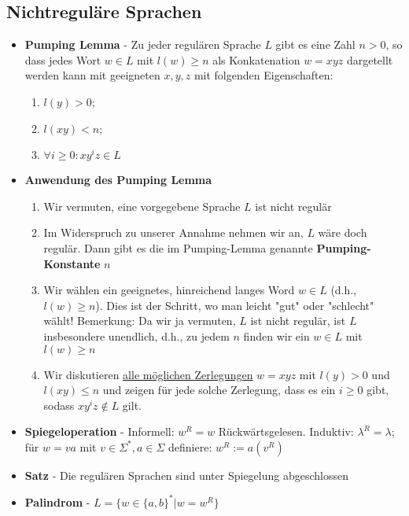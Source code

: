 \documentclass[12pt, a4paper]{article}
\begin{document}
	\subsection{Nichtreguläre Sprachen}
	\begin{itemize}
		\item \textbf{Pumping Lemma} - Zu jeder regulären Sprache $L$ gibt es eine Zahl $n>0$, so dass jedes Wort $w\in L$ mit $l(w)\geq n$ als Konkatenation $w = xyz$ dargetellt werden kann mit geeigneten $x,y,z$ mit folgenden Eigenschaften:
		\begin{enumerate}
			\item $l(y)>0$;
			\item $l(xy)<n$;
			\item $\forall i\geq0:xy^{i}z\in L$
		\end{enumerate}
		
		\item \textbf{Anwendung des Pumping Lemma}
		\begin{enumerate}
			\item Wir vermuten, eine vorgegebene Sprache $L$ ist nicht regulär
			
			\item Im Widerspruch zu unserer Annahme nehmen wir an, $L$ wäre doch regulär. Dann gibt es die im Pumping-Lemma genannte \textbf{Pumping-Konstante} $n$
			
			\item Wir wählen ein geeignetes, hinreichend langes Word $w\in L$ (d.h., $l(w)\geq n$). Dies ist der Schritt, wo man leicht "gut" oder "schlecht" wählt! Bemerkung: Da wir ja vermuten, $L$ ist nicht regulär, ist $L$ insbesondere unendlich, d.h., zu jedem $n$ finden wir ein $w\in L$ mit $l(w)\geq n$
			
			\item Wir diskutieren \underline{alle möglichen Zerlegungen} $w=xyz$ mit $l(y)>0$ und $l(xy)\leq n$ und zeigen für jede solche Zerlegung, dass es ein $i\geq0$ gibt, sodass $xy^{i}z\notin L$ gilt.
		\end{enumerate}
		
		\item \textbf{Spiegeloperation} - Informell: $w^{R} = w$ Rückwärtsgelesen. Induktiv: $\lambda^{R}=\lambda$; für $w=va$ mit $v\in\Sigma^{*}, a\in\Sigma$ definiere: $w^{R}:=a(v^{R})$
		
		\item \textbf{Satz} - Die regulären Sprachen sind unter Spiegelung abgeschlossen
		
		\item \textbf{Palindrom} - $L=\{w\in\{a,b\}^{*}|w=w^{R}\}$
		

\end{itemize}
\end{document}
